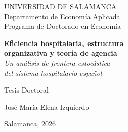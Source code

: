 ﻿\begin{titlepage}
\centering
\vspace*{2cm}

{\large UNIVERSIDAD DE SALAMANCA}\\[0.3cm]
{\normalsize Departamento de Economía Aplicada}\\[0.3cm]
{\normalsize Programa de Doctorado en Economía}

\vspace{2.5cm}

{\LARGE\bfseries Eficiencia hospitalaria, estructura\\[0.3cm]
organizativa y teoría de agencia}\\[0.6cm]
{\Large\itshape Un análisis de frontera estocástica\\
del sistema hospitalario español}

\vspace{2.5cm}

{\large Tesis Doctoral}

\vspace{1.5cm}

{\large José María Elena Izquierdo}

\vfill

{\normalsize Salamanca, 2026}
\end{titlepage}
